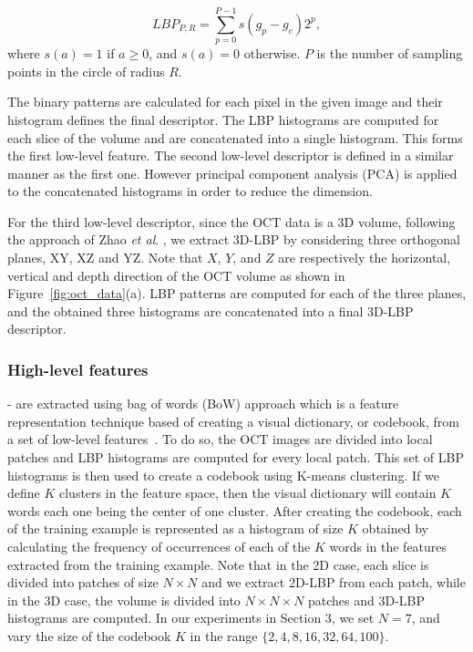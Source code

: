 \begin{equation} \label{Eq:LBP}
LBP_{P,R} = \sum_{p=0}^{P-1}s(g_{p} - g_{c})2^{p},
\end{equation}
where $s(a) = 1$ if $a \geq 0$, and $s(a)=0$ otherwise. $P$ is the number of sampling points in the circle of radius $R$.

The binary patterns are calculated for each pixel in the given image and their histogram defines the final descriptor.
The LBP histograms are computed for each slice of the volume and are concatenated into a single histogram. This forms the first low-level feature.
The second low-level descriptor is defined in a similar manner as the first one. However principal component analysis (PCA) is applied to the concatenated histograms in order to reduce the dimension.

For the third low-level descriptor, since the OCT data is a 3D volume, following the approach of Zhao \textit{et al}. \cite{zhao2007dynamic}, we extract 3D-LBP by considering three orthogonal planes, XY, XZ and YZ. Note that $X$, $Y$, and $Z$ are respectively the horizontal, vertical and depth direction of the OCT volume as shown in Figure~\ref{fig:oct_data}(a).
LBP patterns are computed for each of the three planes, and the obtained three histograms are concatenated into a final 3D-LBP descriptor.



\subsubsection{High-level features} - are extracted using bag of words (BoW) approach which is a feature representation technique based of creating a visual dictionary, or codebook, from a set of low-level features~\cite{Sivic2003}. 
To do so, the OCT images are divided into local patches and LBP histograms are computed for every local patch.
This set of LBP histograms is then used to create a codebook using K-means clustering. If we define $K$ clusters in the feature space, then the visual dictionary will contain $K$ words each one being the center of one cluster.
After creating the codebook, each of the training example is represented as a histogram of size $K$ obtained by calculating the frequency of occurrences of each of the $K$ words in the features extracted from the training example. 
Note that in the 2D case, each slice is divided into patches of size $N\times N$ and we extract 2D-LBP from each patch, while in the 3D case, the volume is divided into $N \times N \times N$ patches and 3D-LBP histograms are computed. In our experiments in Section 3, we set $N=7$, and vary the size of the codebook $K$ in the range $\{2, 4, 8, 16, 32, 64, 100 \}$.
% 

